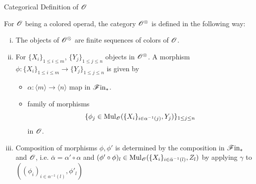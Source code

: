 \begin{frame}{Categorical Definition of $\mathscr{O}$}
   \begin{defin}\label{def:Ox} \small{For $\mathscr{O}$ being a colored operad, the category $\mathscr{O}^{\otimes}$
    is defined in the following way:
    \begin{enumerate}[(i)]
        \item The objects of $\mathscr{O}^{\otimes}$ are finite sequences of colors of $\mathscr{O}$.
        \item For $\{X_i\}_{1 \leq i \leq m}$, $\{Y_j\}_{1 \leq j \leq n}$
        objects in $\mathscr{O}^{\otimes}$. A morphism
            $\phi \colon \{X_i\}_{1 \leq i \leq m} \to \{Y_j\}_{1 \leq j \leq n}$
        is given by
        
        \begin{itemize}
          \item $\alpha \colon \langle m \rangle \to \langle n
        \rangle$ map in $\mathscr{F} \text{in}_{\ast}$.
        \item family of morphisms
        \[
            \{ \phi_j \in \operatorname{Mul}_{\mathscr{O}}(\{X_i\}_{i \in \alpha^{-1}(j)}, Y_j)\}_{1 \leq j \leq n}
        \]
        in $\mathscr{O}$.
        \end{itemize}
        
        \item Composition of morphisms $\phi, \phi'$ is determined by the composition in
        $\mathscr{F} \text{in}_{\ast}$ and $\mathscr{O}$, i.e. $\bar{\alpha} = \alpha'\circ \alpha$ and
        $
            (\phi' \circ \phi)_l \in  \Mul_{\O}(\{X_i\}_{i \in \bar{\alpha}^{-1}(l)}, Z_l)%
        $
        by applying $\gamma$ to $((\phi_i)_{i \in \alpha^{-1}(l)}, \phi'_l)$
    \end{enumerate}}
\end{defin}
\end{frame}

